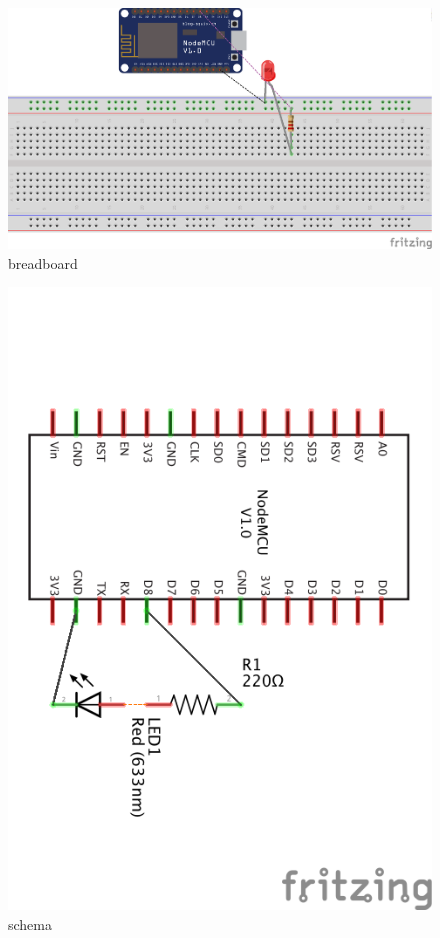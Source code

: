 \begin{figure}
\centering
\includegraphics{../images/led-esp8266_bb.png}
\caption{breadboard}
\end{figure}

\begin{figure}
\centering
\includegraphics{../images/led-esp8266_schem.png}
\caption{schema}
\end{figure}


